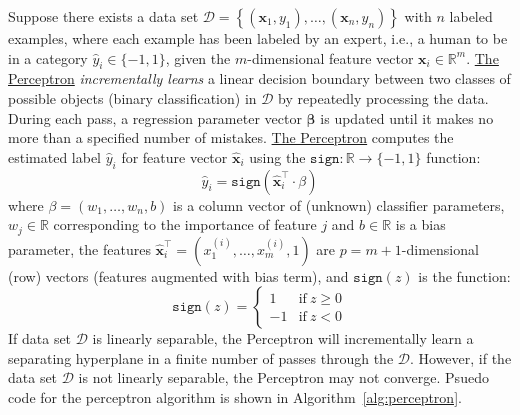 \documentclass{article}[11pt]
\begin{document}
Suppose there exists a data set
$\mathcal{D} = \left\{(\mathbf{x}_{1},y_{1}),\dotsc,(\mathbf{x}_{n},y_{n})\right\}$ with $n$ labeled examples, where each example has been labeled by an expert, i.e., a human to be in a category $\hat{y}_{i}\in\{-1,1\}$, given the $m$-dimensional feature vector $\mathbf{x}_{i}\in\mathbb{R}^{m}$.  
\href{https://en.wikipedia.org/wiki/Perceptron}{The Perceptron} \textit{incrementally learns} a linear decision boundary between two classes of possible objects (binary classification) in $\mathcal{D}$ by repeatedly processing the data. 
During each pass, a regression parameter vector $\mathbf{\beta}$ is updated until it makes no more than a specified number of mistakes. 
\href{https://en.wikipedia.org/wiki/Perceptron}{The Perceptron} computes the estimated label $\hat{y}_{i}$ for feature vector $\hat{\mathbf{x}}_{i}$ using the $\texttt{sign}:\mathbb{R}\to\{-1,1\}$ function:
\begin{equation*}
    \hat{y}_{i} = \texttt{sign}\left(\hat{\mathbf{x}}_{i}^{\top}\cdot\beta\right)
\end{equation*}
where $\beta=\left(w_{1},\dots,w_{n}, b\right)$ is a column vector of (unknown) classifier parameters, 
$w_{j}\in\mathbb{R}$ corresponding to the importance of feature $j$ and $b\in\mathbb{R}$ is a bias parameter, 
the features $\hat{\mathbf{x}}^{\top}_{i}=\left(x^{(i)}_{1},\dots,x^{(i)}_{m}, 1\right)$ are $p = m+1$-dimensional (row) vectors 
(features augmented with bias term), and $\texttt{sign}(z)$ is the function:
\begin{equation*}
    \texttt{sign}(z) = 
    \begin{cases}
        1 & \text{if}~z\geq{0}\\
        -1 & \text{if}~z<0
    \end{cases}
\end{equation*}
If data set $\mathcal{D}$ is linearly separable, the Perceptron will incrementally learn a separating hyperplane in a finite number of passes through the $\mathcal{D}$. 
However, if the data set $\mathcal{D}$ is not linearly separable, the Perceptron may not converge. 
Psuedo code for the perceptron algorithm is shown in Algorithm~\ref{alg:perceptron}.
\end{document}
